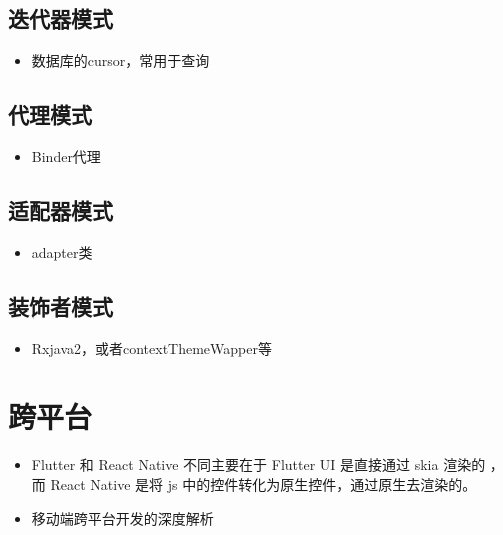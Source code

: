 \documentclass[9pt, b5paper]{article}
\begin{document}
\subsection{迭代器模式}
\label{sec-15-20}
\begin{itemize}
\item 数据库的cursor，常用于查询
\end{itemize}
\subsection{代理模式}
\label{sec-15-21}
\begin{itemize}
\item Binder代理
\end{itemize}
\subsection{适配器模式}
\label{sec-15-22}
\begin{itemize}
\item adapter类
\end{itemize}
\subsection{装饰者模式}
\label{sec-15-23}
\begin{itemize}
\item Rxjava2，或者contextThemeWapper等
\end{itemize}
\section{跨平台}
\label{sec-16}
\begin{itemize}
\item Flutter 和 React Native 不同主要在于 Flutter UI 是直接通过 skia 渲染的 ，而 React Native 是将 js 中的控件转化为原生控件，通过原生去渲染的。
\item 移动端跨平台开发的深度解析
\end{itemize}
\end{document}
